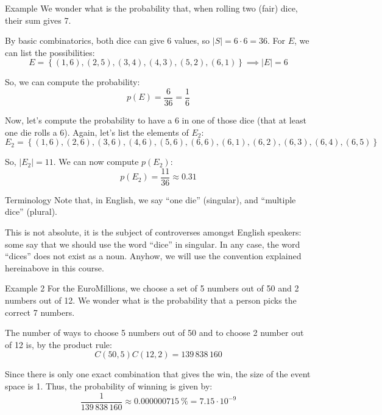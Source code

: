 \documentclass[a4paper]{article}
\begin{document}
\begin{parag}{Example}
    We wonder what is the probability that, when rolling two (fair) dice, their sum gives 7. 

    By basic combinatorics, both dice can give 6 values, so $\left|S\right| = 6 \cdot 6 = 36$. For $E$, we can list the possibilities: 
    \[E = \left\{\left(1, 6\right), \left(2, 5\right), \left(3, 4\right), \left(4, 3\right), \left(5, 2\right), \left(6, 1\right)\right\} \implies \left|E\right| = 6\]

    So, we can compute the probability: 
    \[p\left(E\right) = \frac{6}{36} = \frac{1}{6}\]

    Now, let's compute the probability to have a 6 in one of those dice (that at least one die rolls a 6). Again, let's list the elements of $E_2$: 
    \[E_2 = \left\{\left(1, 6\right), \left(2, 6\right), \left(3, 6\right), \left(4, 6\right), \left(5, 6\right), \left(6, 6\right), \left(6,1\right), \left(6, 2\right), \left(6, 3\right), \left(6, 4\right), \left(6, 5\right)\right\}\]
    
    So, $\left|E_2\right| = 11$. We can now compute $p\left(E_2\right)$:
    \[p\left(E_2\right)= \frac{11}{36} \approx 0.31\]

    \begin{subparag}{Terminology}
        Note that, in English, we say ``one die'' (singular), and ``multiple dice'' (plural).

        This is not absolute, it is the subject of controverses amongst English speakers: some say that we should use the word ``dice'' in singular. In any case, the word ``dices'' does not exist as a noun. Anyhow, we will use the convention explained hereinabove in this course.
    \end{subparag}
\end{parag}

\begin{parag}{Example 2}
    For the EuroMillions, we choose a set of 5 numbers out of 50 and 2 numbers out of 12. We wonder what is the probability that a person picks the correct 7 numbers.

    The number of ways to choose 5 numbers out of 50 and to choose 2 number out of 12 is, by the product rule: 
    \[C\left(50, 5\right)C\left(12, 2\right) = 139\,838\,160\]
    
    Since there is only one exact combination that gives the win, the size of the event space is 1. Thus, the probability of winning is given by: 
    \[\frac{1}{139\,838\,160} \approx \SI{0.000000715}{\percent} = 7.15 \cdot 10^{-9}\]
\end{parag}
\end{document}
